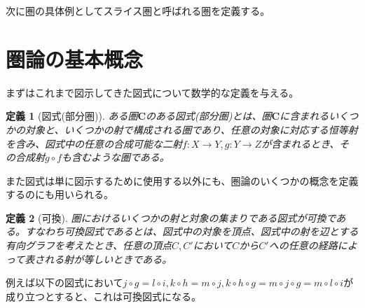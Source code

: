 \documentclass[dvipdfmx]{jsarticle}
\newcommand{\cat}[1]{\boldsymbol{#1}}
\newcommand{\arrow}{\rightarrow}
\newcommand{\mor}[3]{#1:#2\arrow #3}
\newtheorem{define}{定義}[section]
\begin{document}

	次に圏の具体例としてスライス圏と呼ばれる圏を定義する。

	\section{圏論の基本概念}
	まずはこれまで図示してきた図式について数学的な定義を与える。
	\begin{define}[図式(部分圏)]
		ある圏$\cat{C}$のある図式(部分圏)とは、圏$\cat{C}$に含まれるいくつかの対象と、いくつかの射で構成される圏であり、任意の対象に対応する恒等射を含み、図式中の任意の合成可能な二射$\mor{f}{X}{Y},\mor{g}{Y}{Z}$が含まれるとき、その合成射$g\circ f$も含むような圏である。
	\end{define}
	また図式は単に図示するために使用する以外にも、圏論のいくつかの概念を定義するのにも用いられる。
	\begin{define}[可換]
		圏におけるいくつかの射と対象の集まりである図式が可換である。すなわち可換図式であるとは、図式中の対象を頂点、図式中の射を辺とする有向グラフを考えたとき、任意の頂点$C,C'$において$C$から$C'$への任意の経路によって表される射が等しいときである。
	\end{define}
	例えば以下の図式において$j\circ g=l\circ i,k\circ h=m\circ j,k\circ h\circ g=m\circ j\circ g = m\circ l\circ i$が成り立つとすると、これは可換図式になる。
\end{document}
